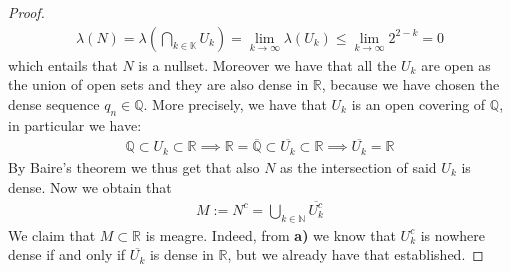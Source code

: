 \documentclass[12pt,a4paper]{article}
\begin{document}
\begin{proof}
\begin{align*}
\lambda (N) = \lambda \left( \bigcap_{k \in \mathbb{K}} U_k \right) = \lim_{k \to \infty} \lambda (U_k) \leq \lim_{k \to \infty} 2^{2-k} = 0 
\end{align*}
which entails that $N$ is a nullset. 
\newpage
Moreover we have that all the $U_k$ are open as the union of open sets and they are also dense in $\mathbb{R}$, because we have chosen the dense sequence $q_n \in \mathbb{Q}$. More precisely, we have that $U_k$ is an open covering of $\mathbb{Q}$, in particular we have:
\begin{align*}
\mathbb{Q} \subset U_k \subset \mathbb{R} \implies \mathbb{R}=\overline{\mathbb{Q}} \subset \overline{U_k} \subset \mathbb{R} \implies \overline{U_k} = \mathbb{R}
\end{align*}
By Baire's theorem we thus get that also $N$ as the intersection of said $U_k$ is dense. Now we obtain that
\begin{align*}
M:= N^c = \bigcup_{k \in \mathbb{N}} \overline{U_k^c}
\end{align*}
We claim that $M \subset \mathbb{R}$ is meagre. Indeed, from \textbf{a)} we know that $U_k^c$ is nowhere dense if and only if $\overline{U_k}$ is dense in $\mathbb{R}$, but we already have that established. 
\end{proof}
\newpage
\end{document}
